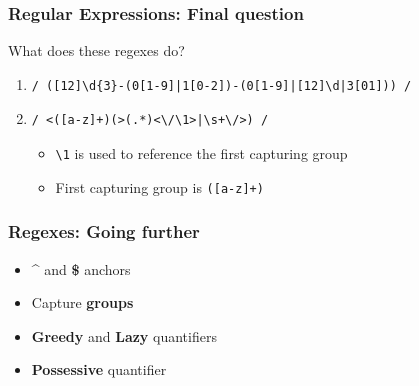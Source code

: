 \documentclass{beamer}
\begin{document}
\begin{frame}[fragile]
    \frametitle{Regular Expressions: Final question}
    \begin{center}
        What does these regexes do?
    \end{center}
    \vspace{1em}
    \begin{enumerate}
        \item \begin{verbatim}/ ([12]\d{3}-(0[1-9]|1[0-2])-(0[1-9]|[12]\d|3[01])) /\end{verbatim}
        \vspace{1em}
        \item \begin{verbatim}/ <([a-z]+)(>(.*)<\/\1>|\s+\/>) /\end{verbatim}
        \begin{itemize}
            \item \texttt{\textbackslash 1} is used to reference the first capturing group
            \item First capturing group is \texttt{([a-z]+)}
        \end{itemize}
    \end{enumerate}
\end{frame}

\begin{frame}[fragile]
    \frametitle{Regexes: Going further}
    \begin{itemize}
        \item \textbf{\textasciicircum} and \textbf{\$} anchors
        \item Capture \textbf{groups}
        \item \textbf{Greedy} and \textbf{Lazy} quantifiers
        \item \textbf{Possessive} quantifier
    \end{itemize}
\end{frame}

\end{document}

